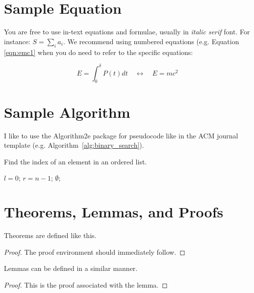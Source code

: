 \section{Sample Equation}

You are free to use in-text equations and formulae, usually in \textit{italic serif} font. For instance: $S = \sum_i a_i$. We recommend using numbered equations (e.g. Equation \ref{eqn:emc1} when you do need to refer to the specific equations:

\begin{equation}
E = \int_0^{\delta} P(t) dt \quad \longleftrightarrow \quad E = m c^2
\label{eqn:emc1}
\end{equation} 

\section{Sample Algorithm}

I like to use the Algorithm2e package for pseudocode like in the ACM journal template (e.g. Algorithm~\ref{alg:binary_search}).

\begin{algorithm}
\caption{Find the index of an element in an ordered list.}
\label{alg:binary_search}
$l = 0$;
$r = n - 1$;
\Return $\emptyset$;
\end{algorithm}

\section{Theorems, Lemmas, and Proofs}

\begin{theorem}
    Theorems are defined like this.
\end{theorem}
\begin{proof}
    The proof environment should immediately follow.
\end{proof}

\begin{lemma}
    Lemmas can be defined in a similar manner.
\end{lemma}
\begin{proof}
    This is the proof associated with the lemma.
\end{proof}
